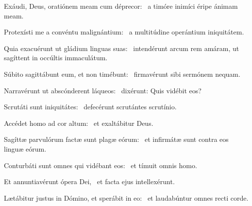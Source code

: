 \item Exáudi, Deus, oratiónem meam cum déprecor:~\psstar{} a timóre inimíci éripe ánimam meam.

\item Protexísti me a convéntu malignántium:~\psstar{} a multitúdine operántium iniquitátem.

\item Quia exacuérunt ut gládium linguas suas:~\psstar{} intendérunt arcum rem amáram, ut sagíttent in occúltis immaculátum.

\item Súbito sagittábunt eum, et non timébunt:~\psstar{} firmavérunt sibi sermónem nequam.

\item Narravérunt ut abscónderent láqueos:~\psstar{} dixérunt: Quis vidébit eos?

\item Scrutáti sunt iniquitátes:~\psstar{} defecérunt scrutántes scrutínio.

\item Accédet homo ad cor altum:~\psstar{} et exaltábitur Deus.

\item Sagíttæ parvulórum factæ sunt plagæ eórum:~\psstar{} et infirmátæ sunt contra eos linguæ eórum.

\item Conturbáti sunt omnes qui vidébant eos:~\psstar{} et tímuit omnis homo.

\item Et annuntiavérunt ópera Dei,~\psstar{} et facta ejus intellexérunt.

\item Lætábitur justus in Dómino, et sperábit in eo:~\psstar{} et laudabúntur omnes recti corde.
